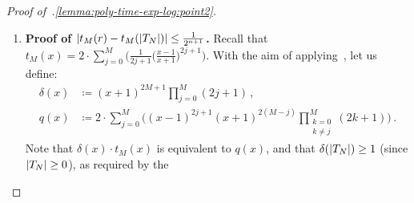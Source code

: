 \begin{proof}[Proof of~.\ref{lemma:poly-time-exp-log:point2}]
\begin{enumerate}
      \begin{itemize}
        \item \textbf{Proof of $Z_2 \leq -\log\abs{\frac{r-1}{r+1}}$}. Note that $\abs{\frac{r-1}{r+1}} \in (0,1)$, since $r > 0$ and $r \neq 1$; hence $-\log\abs{\frac{r-1}{r+1}} > 0$. 
        By~, $-\log\abs{\frac{r-1}{r+1}} >
        -\abs{\frac{r-1}{r+1}} + 1$. By definition of $Z_2$ in
        line~\ref{approxln:line5}, it suffices to prove $-\abs{\frac{r-1}{r+1}}
        \geq \min(-\abs{\frac{L-1}{L+1}},-\abs{\frac{U-1}{U+1}})$, or,
        equivalently, $\abs{\frac{r-1}{r+1}} \leq
        \max(\abs{\frac{L-1}{L+1}},\abs{\frac{U-1}{U+1}})$. Recall that $0 < L
        \leq r \leq U$. The first derivative $f'$ of the function $f(x)
        \coloneqq \abs{\frac{x-1}{x+1}}$ is $f'(x) = \frac{2(x-1)}{(x+1)^3
        \abs{\frac{x-1}{x+1}}}$. Observe that for $x \in (0,1)$, $f'$ is always
        negative, whereas for $x > 1$, $f'$ is always positive. Therefore, if $r
        < 1$ we have $\abs{\frac{r-1}{r+1}} \leq \abs{\frac{L-1}{L+1}}$, whereas
        for $r > 1$ we have $\abs{\frac{r-1}{r+1}} \leq \abs{\frac{U-1}{U+1}}$.
        \item \textbf{Proof of $Z_1 \geq \log\abs{\ln(r)}$}. Recall that ${0 < L \leq r \leq U}$ and that $Z_1$ is define in line~\ref{approxln:line4} 
        as~$\ceil{\max(\abs{\ln(L)},\abs{\ln(U)})}$.
        Since $\log(x) \leq x$ for every $x > 0$, it suffices to show
        $\max(\abs{\ln(L)},\abs{\ln(U)}) \geq \abs{\ln(r)}$. This is immediate.
        If $r < 1$, then $0 < L \leq r$ implies $\abs{\ln(L)} \geq
        \abs{\ln(r)}$. Otherwise, if $r > 1$, then $r \leq U$ implies
        $\abs{\ln(U)} \geq \abs{\ln(r)}$.
      \end{itemize}
    \item \textbf{Proof of $\left|t_M(r)-t_M(\left|T_N\right|)\right| \leq \frac{1}{2^{n+1}}$.}
      Recall that $t_M(x) = 2 \cdot \sum_{j=0}^M \big(\frac{1}{2j+1} \big(\frac{x-1}{x+1}\big)^{2j+1}\big)$.
      With the aim of applying~, let us define:
      \begin{align*}
        \delta(x) &\coloneqq (x+1)^{2M+1} \prod_{j=0}^M (2j+1)\,,\\
        q(x) &\coloneqq 2 \cdot \sum_{j=0}^M \Big( (x-1)^{2j+1} (x+1)^{2(M-j)} \prod_{\substack{k=0\\k \neq j}}^M (2k+1) \Big)\,.
      \end{align*}
      Note that $\delta(x) \cdot t_M(x)$ is equivalent to $q(x)$, and that
      $\delta(\left|T_N\right|) \geq 1$ (since $\left|T_N\right| \geq 0$), as required by the

\end{enumerate}
\end{proof}
